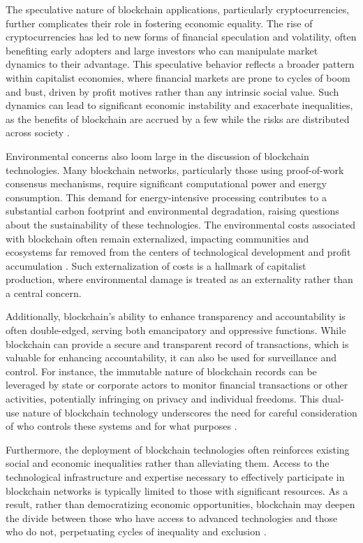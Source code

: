 \begin{refsection}
The speculative nature of blockchain applications, particularly cryptocurrencies, further complicates their role in fostering economic equality. The rise of cryptocurrencies has led to new forms of financial speculation and volatility, often benefiting early adopters and large investors who can manipulate market dynamics to their advantage. This speculative behavior reflects a broader pattern within capitalist economies, where financial markets are prone to cycles of boom and bust, driven by profit motives rather than any intrinsic social value. Such dynamics can lead to significant economic instability and exacerbate inequalities, as the benefits of blockchain are accrued by a few while the risks are distributed across society \cite[pp.~74-76]{harvey2014seventeen}.

Environmental concerns also loom large in the discussion of blockchain technologies. Many blockchain networks, particularly those using proof-of-work consensus mechanisms, require significant computational power and energy consumption. This demand for energy-intensive processing contributes to a substantial carbon footprint and environmental degradation, raising questions about the sustainability of these technologies. The environmental costs associated with blockchain often remain externalized, impacting communities and ecosystems far removed from the centers of technological development and profit accumulation \cite[pp.~133-136]{parikka2015anthrobscene}. Such externalization of costs is a hallmark of capitalist production, where environmental damage is treated as an externality rather than a central concern.

Additionally, blockchain's ability to enhance transparency and accountability is often double-edged, serving both emancipatory and oppressive functions. While blockchain can provide a secure and transparent record of transactions, which is valuable for enhancing accountability, it can also be used for surveillance and control. For instance, the immutable nature of blockchain records can be leveraged by state or corporate actors to monitor financial transactions or other activities, potentially infringing on privacy and individual freedoms. This dual-use nature of blockchain technology underscores the need for careful consideration of who controls these systems and for what purposes \cite[pp.~98-101]{fuchs2011foundations}.

Furthermore, the deployment of blockchain technologies often reinforces existing social and economic inequalities rather than alleviating them. Access to the technological infrastructure and expertise necessary to effectively participate in blockchain networks is typically limited to those with significant resources. As a result, rather than democratizing economic opportunities, blockchain may deepen the divide between those who have access to advanced technologies and those who do not, perpetuating cycles of inequality and exclusion \cite[pp.~45-48]{schiller2000digital}.


\end{refsection}
